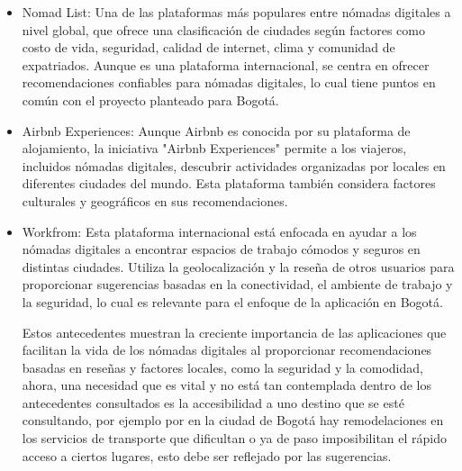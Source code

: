\begin{itemize}
	\item Nomad List: Una de las plataformas más populares entre nómadas digitales a nivel global, que ofrece una clasificación de ciudades según factores como costo de vida, seguridad, calidad de internet, clima y comunidad de expatriados. Aunque es una plataforma internacional, se centra en ofrecer recomendaciones confiables para nómadas digitales, lo cual tiene puntos en común con el proyecto planteado para Bogotá.

	\item Airbnb Experiences: Aunque Airbnb es conocida por su plataforma de alojamiento, la iniciativa "Airbnb Experiences" permite a los viajeros, incluidos nómadas digitales, descubrir actividades organizadas por locales en diferentes ciudades del mundo. Esta plataforma también considera factores culturales y geográficos en sus recomendaciones.

	\item Workfrom: Esta plataforma internacional está enfocada en ayudar a los nómadas digitales a encontrar espacios de trabajo cómodos y seguros en distintas ciudades. Utiliza la geolocalización y la reseña de otros usuarios para proporcionar sugerencias basadas en la conectividad, el ambiente de trabajo y la seguridad, lo cual es relevante para el enfoque de la aplicación en Bogotá.

	      Estos antecedentes muestran la creciente importancia de las aplicaciones que facilitan la vida de los nómadas digitales al proporcionar recomendaciones basadas en reseñas y factores locales, como la seguridad y la comodidad, ahora, una necesidad que es vital y no está tan contemplada dentro de los antecedentes consultados es la accesibilidad a uno destino que se esté consultando, por ejemplo por en la ciudad de Bogotá hay remodelaciones en los servicios de transporte que dificultan o ya de paso imposibilitan el rápido acceso a ciertos lugares, esto debe ser reflejado por las sugerencias.
\end{itemize}

